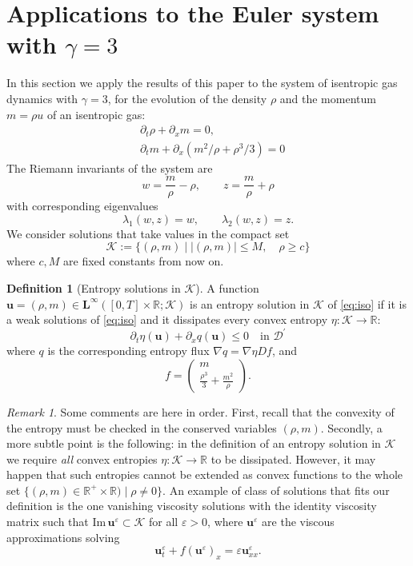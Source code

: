 \documentclass[11pt, twoside, reqno]{amsart}
\theoremstyle{definition}
\newtheorem{defi}[thm]{Definition}
\theoremstyle{remark}
\newtheorem{remark}[thm]{Remark}
\numberwithin{equation}{section}
\newcommand{\mc}[1]{\mathcal{#1}}
\newcommand{\mr}[1]{\mathrm{#1}}
\newcommand{\bs}[1]{\boldsymbol{#1}}
\begin{document}
\section{Applications to the Euler system with $\gamma = 3$}\label{sec:isentropic}
In this section we apply the results of this paper to the system of isentropic gas dynamics with $\gamma = 3$, for the evolution of the density $\rho$ and the momentum $m = \rho u$ of an isentropic gas:
\begin{equation}\label{eq:iso}
\begin{aligned}
    & \partial_t \rho + \partial_x m = 0, \\
    & \partial_t m  + \partial_x (m^2/\rho + \rho^3/3) = 0
    \end{aligned}
\end{equation}
The Riemann invariants of the system are 
\begin{equation}\label{eq:RIiso}
w = \frac{m}{\rho} -\rho, \qquad  z = \frac{m}{\rho} + \rho
\end{equation}
with corresponding eigenvalues
$$
\lambda_1(w,z) = w, \qquad \lambda_2(w,z) = z.
$$
We consider solutions that take values in the compact set
$$
\mathcal K := \Big\{(\rho, m) \; \Big| \; |(\rho, m)| \leq M, \quad \rho \geq c\Big\}
$$
where $c, M$ are fixed constants from now on.
\begin{defi}[Entropy solutions in $\mc K$]\label{defi:entropyK}
A function $\bs u = (\rho, m) \in \mathbf L^\infty([0,T] \times \mathbb R; \mc K)$ is an entropy solution in $\mc K$ of \eqref{eq:iso} if it is a weak solutions of \eqref{eq:iso} and it dissipates every convex entropy $\eta : \mathcal K \to \mathbb R$:
$$
\partial_t \eta(\bs u) + \partial_x q(\bs u) \leq 0 \quad \text{in $\mathscr D^\prime$}
$$
where $q$ is the corresponding entropy flux $\nabla q =\nabla \eta  D f$, and 
$$
f = \begin{pmatrix}
    m \\
    \frac{\rho^3}{3} + \frac{m^2}{\rho}
\end{pmatrix}.
$$
\end{defi}
\begin{remark}
    Some comments are here in order. First,  recall that the convexity of the entropy must be checked in the conserved variables $(\rho, m)$. Secondly, a more subtle point is the following: in the definition of an entropy solution in $\mc K$ we require \emph{all} convex entropies $\eta : \mathcal{K} \to \mathbb{R}$ to be dissipated. However, it may happen that such entropies cannot be extended as convex functions to the whole set $\{(\rho, m) \in \mathbb R^+ \times \mathbb R) \; | \; \rho \neq 0\}$. An example of class of solutions that fits our definition is the one vanishing viscosity solutions with the identity  viscosity matrix such that $\mr{Im} \, \bs u^\varepsilon \subset \mathcal K$ for all  $\varepsilon > 0$, where $\bs u^\varepsilon$ are the viscous approximations solving 
    $$
    \bs u^\varepsilon_t + f(\bs u^\varepsilon)_x = \varepsilon \bs u^\varepsilon_{xx}.
    $$
\end{remark}
\end{document}
